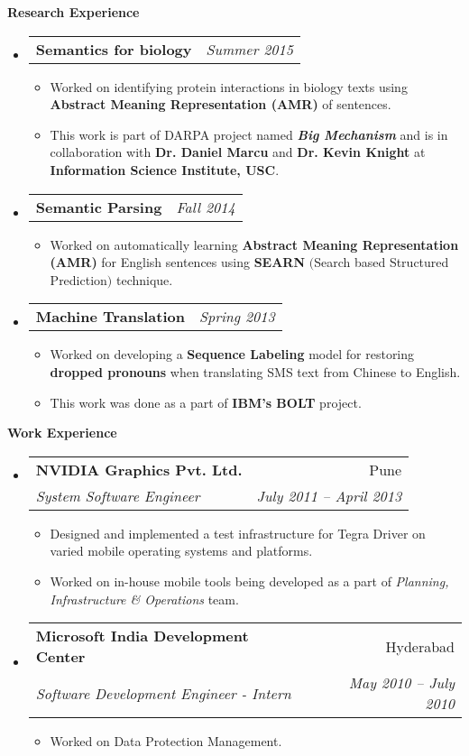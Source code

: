 \documentclass[letterpaper,12pt]{article}
\makeatletter
\newcommand{\resheading}[1]{{\large \colorbox{mygrey}{\begin{minipage}{\textwidth}{\textbf{#1 \vphantom{p\^{E}}}}\end{minipage}}}}
\newcommand{\ressubheading}[4]{
\begin{tabular*}{6in}{l@{\extracolsep{\fill}}r}
		\textbf{#1} & #2 \\
		\textit{#3} & \textit{#4} \\
\end{tabular*}\vspace{-6pt}}
\newcommand{\projectitem}[2]{
\begin{tabular*}{6in}{l@{\extracolsep{\fill}}r}
		\textbf{#1} & \textit{#2} 
\end{tabular*}\vspace{-6pt}}
\makeatother
\begin{document}
\resheading{Research Experience}
\begin{itemize}
\item
\projectitem {Semantics for biology}{Summer 2015}
{\footnotesize
  \begin{itemize}
  \item Worked on identifying protein interactions in biology texts using \textbf{Abstract Meaning Representation (AMR)} of sentences.
  \item This work is part of DARPA project named \textbf {\textit{Big Mechanism}} and is in collaboration with \textbf{Dr. Daniel Marcu} and \textbf{Dr. Kevin Knight} at \textbf{Information Science Institute, USC}.
  \end{itemize}
}
\item
\projectitem {Semantic Parsing}{Fall 2014}
{\footnotesize
  \begin{itemize}
  \item Worked on automatically learning \textbf{Abstract Meaning Representation (AMR)} for English sentences using \textbf{SEARN} $($Search based Structured Prediction$)$ technique.
  \end{itemize}
}
\item
\projectitem {Machine Translation}{Spring 2013}
{\footnotesize
  \begin{itemize}
  \item Worked on developing a \textbf{Sequence Labeling} model for restoring \textbf{dropped pronouns} when translating SMS text from Chinese to English.
  \item This work was done as a part of \textbf{IBM's BOLT} project.
  \end{itemize}
}

\end{itemize}

\resheading{Work Experience}
\begin {itemize}
 \item
\ressubheading{NVIDIA Graphics Pvt. Ltd.}{Pune}{System Software Engineer}{July 2011 -- April 2013}
{\footnotesize
  \begin{itemize}
  \item Designed and implemented a test infrastructure for Tegra Driver on varied mobile operating systems and platforms.
  \item Worked on in-house mobile tools being developed as a part of \textit{Planning, Infrastructure \& Operations} team.
  \end{itemize}
}
\item
\ressubheading{Microsoft India Development Center}{Hyderabad}{Software Development Engineer - Intern}{May 2010 -- July 2010}
{\footnotesize
  \begin{itemize}
  \item Worked on Data Protection Management.
  \end{itemize}
}
\end{itemize}
\end{document}
